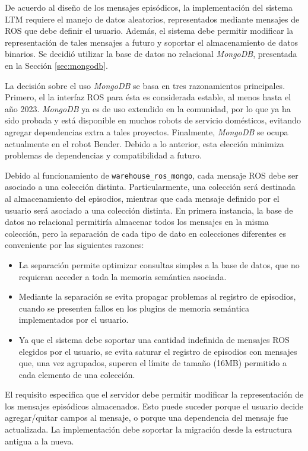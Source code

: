De acuerdo al diseño de los mensajes episódicos, la implementación del sistema LTM requiere el manejo de datos aleatorios, representados mediante mensajes de ROS que debe definir el usuario. Además, el sistema debe permitir modificar la representación de tales mensajes a futuro y soportar el almacenamiento de datos binarios. Se decidió utilizar la base de datos no relacional \textit{MongoDB}, presentada en la Sección \ref{sec:mongodb}. 

La decisión sobre el uso \textit{MongoDB} se basa en tres razonamientos principales. Primero, el la interfaz ROS para ésta es considerada estable, al menos hasta el año 2023. \textit{MongoDB} ya es de uso extendido en la comunidad, por lo que ya ha sido probada y está disponible en muchos robots de servicio domésticos, evitando agregar dependencias extra a tales proyectos. Finalmente, \textit{MongoDB} se ocupa actualmente en el robot Bender. Debido a lo anterior, esta elección minimiza problemas de dependencias y compatibilidad a futuro.


Debido al funcionamiento de \texttt{warehouse\_ros\_mongo}, cada mensaje ROS debe ser asociado a una colección distinta. Particularmente, una colección será destinada al almacenamiento del episodios, mientras que cada mensaje definido por el usuario será asociado a una colección distinta. En primera instancia, la base de datos no relacional permitiría almacenar todos los mensajes en la misma colección, pero la separación de cada tipo de dato en colecciones diferentes es conveniente por las siguientes razones:
\begin{itemize}
\item La separación permite optimizar consultas simples a la base de datos, que no requieran acceder a toda la memoria semántica asociada.
\item Mediante la separación se evita propagar problemas al registro de episodios, cuando se presenten fallos en los plugins de memoria semántica implementados por el usuario.
\item Ya que el sistema debe soportar una cantidad indefinida de mensajes ROS elegidos por el usuario, se evita saturar el registro de episodios con mensajes que, una vez agrupados, superen el límite de tamaño (16MB) permitido a cada elemento de una colección.
\end{itemize}

El requisito  especifica que el servidor debe permitir modificar la representación de los mensajes episódicos almacenados. Esto puede suceder porque el usuario decide agregar/quitar campos al mensaje, o porque una dependencia del mensaje fue actualizada. La implementación debe soportar la migración desde la estructura antigua a la nueva.

